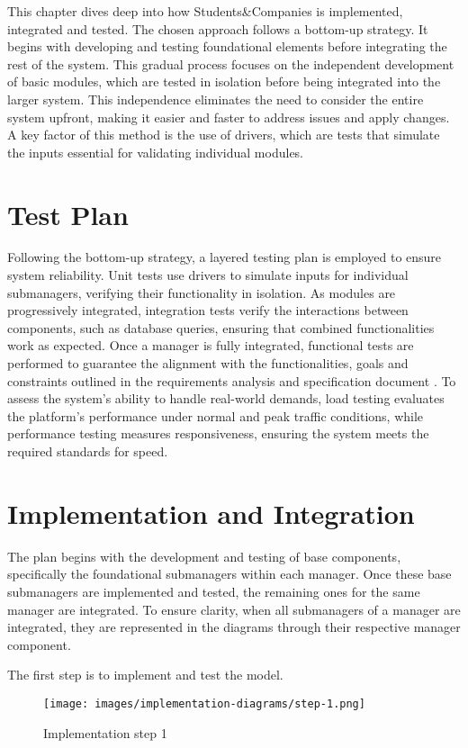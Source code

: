 This chapter dives deep into how Students\&Companies is implemented, integrated and tested.
The chosen approach follows a bottom-up strategy.
It begins with developing and testing foundational elements before integrating the rest of the system.
This gradual process focuses on the independent development of basic modules, which are tested in isolation before being integrated into the larger system.
This independence eliminates the need to consider the entire system upfront, making it easier and faster to address issues and apply changes.
A key factor of this method is the use of drivers, which are tests that simulate the inputs essential for validating individual modules.

\section{Test Plan}
Following the bottom-up strategy, a layered testing plan is employed to ensure system reliability.
Unit tests use drivers to simulate inputs for individual submanagers, verifying their functionality in isolation.
As modules are progressively integrated, integration tests verify the interactions between components, such as database queries, ensuring that combined functionalities work as expected.
Once a manager is fully integrated, functional tests are performed to guarantee the alignment with the functionalities, goals and constraints outlined in the requirements analysis and specification document \cite{carraracurrodossi2024}.
To assess the system's ability to handle real-world demands, load testing evaluates the platform's performance under normal and peak traffic conditions, while performance testing measures responsiveness, ensuring the system meets the required standards for speed.

\section{Implementation and Integration}
The plan begins with the development and testing of base components, specifically the foundational submanagers within each manager.
Once these base submanagers are implemented and tested, the remaining ones for the same manager are integrated. 
To ensure clarity, when all submanagers of a manager are integrated, they are represented in the diagrams through their respective manager component.

\newpage
The first step is to implement and test the model.

\begin{figure}[h]
    \centering
    \texttt{[image: images/implementation-diagrams/step-1.png]}
    \caption{Implementation step 1}
\end{figure}

